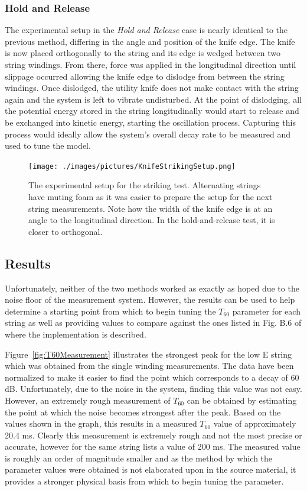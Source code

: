 \documentclass[../main.tex]{subfiles}
\begin{document}
\subsubsection{Hold and Release}
The experimental setup in the \emph{Hold and Release} case is nearly identical to the previous method, differing in the angle and position of the knife edge. The knife is now placed orthogonally to the string and its edge is wedged between two string windings. From there, force was applied in the longitudinal direction until slippage occurred allowing the knife edge to dislodge from between the string windings. Once dislodged, the utility knife does not make contact with the string again and the system is left to vibrate undisturbed. At the point of dislodging, all the potential energy stored in the string longitudinally would start to release and be exchanged into kinetic energy, starting the oscillation process. Capturing this process would ideally allow the system's overall decay rate to be measured and used to tune the model.

\begin{figure}[h]
    \centering
    \texttt{[image: ./images/pictures/KnifeStrikingSetup.png]}
    \caption{The experimental setup for the striking test. Alternating strings have muting foam as it was easier to prepare the setup for the next string measurements. Note how the width of the knife edge is at an angle to the longitudinal direction. In the hold-and-release test, it is closer to orthogonal.}
    \label{fig:KnifeStrikingSetup}
\end{figure}

\subsection{Results}
\label{sec:T60Measurement}
Unfortunately, neither of the two methods worked as exactly as hoped due to the noise floor of the measurement system. However, the results can be used to help determine a starting point from which to begin tuning the $T_{60}$ parameter for each string as well as providing values to compare against the ones listed in Fig. B.6 of  where the implementation is described.

Figure~\ref{fig:T60Measurement} illustrates the strongest peak for the low E string which was obtained from the single winding measurements. The data have been normalized to make it easier to find the point which corresponds to a decay of 60 dB. Unfortunately, due to the noise in the system, finding this value was not easy. However, an extremely rough measurement of $T_{60}$ can be obtained by estimating the point at which the noise becomes strongest after the peak. Based on the values shown in the graph, this results in a measured $T_{60}$ value of approximately 20.4 ms. Clearly this measurement is extremely rough and not the most precise or accurate, however for the same string  lists a value of 200 ms. The measured value is roughly an order of magnitude smaller and as the method by which the parameter values were obtained is not elaborated upon in the source material, it provides a stronger physical basis from which to begin tuning the parameter.
\end{document}
